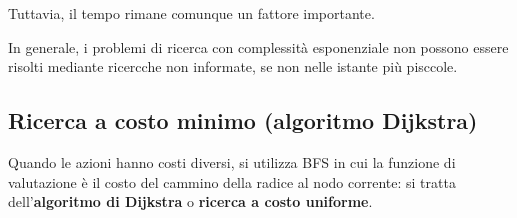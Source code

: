 \documentclass[a4paper, 12pt]{book}
\begin{document}
    Tuttavia, il tempo rimane comunque un fattore importante.

    In generale, i problemi di ricerca con complessità esponenziale non possono essere risolti mediante ricercche non informate, se non nelle istante più pisccole.

    \subsection*{Ricerca a costo minimo (algoritmo Dijkstra)}
    Quando le azioni hanno costi diversi, si utilizza BFS in cui la funzione di valutazione è il costo del cammino della radice al nodo corrente: si tratta dell'\textbf{algoritmo di Dijkstra} o \textbf{ricerca a costo uniforme}.
\end{document}
